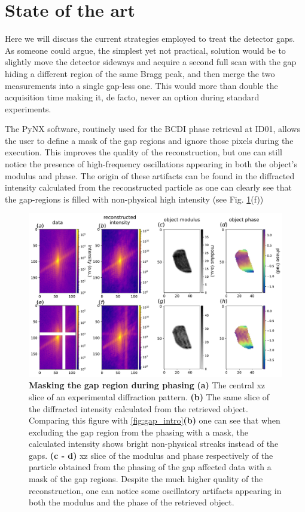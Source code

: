 \section{State of the art}\label{sec:InpStateArt}

Here we will discuss the current strategies employed to treat the detector gaps. As someone could argue, the simplest
yet not practical, solution would be to slightly move the detector sideways and acquire a second full scan with the
gap hiding a different region of the same Bragg peak, and then merge the two measurements into a single gap-less one. 
This would more than double the acquisition time making it, de facto, never an option during standard experiments. 

The PyNX software, routinely used for the BCDI phase retrieval at ID01, allows the user to define a mask of the gap 
regions and ignore those pixels during the execution. This improves the quality of the reconstruction, 
but one can still notice the presence of high-frequency oscillations appearing in both the object's modulus and phase.
The origin of these artifacts can be found in the diffracted intensity calculated from the reconstructed particle as 
one can clearly see that the gap-regions is filled with non-physical high intensity (see Fig. \ref{fig:gap_intro_mask}(f))

\begin{figure}[h]
    \includegraphics[width=\textwidth]{figures/Inpainting/gaps_mask.pdf}
    \caption{\textbf{Masking the gap region during phasing} 
    \textbf{(a)} The central xz slice of an experimental diffraction pattern. \textbf{(b)} The same slice of the diffracted
    intensity calculated from the retrieved object. Comparing this figure with \ref{fig:gap_intro}\textbf{(b)} one can see that
    when excluding the gap region from the phasing with a mask, the calculated intensity shows bright non-physical streaks 
    instead of the gaps. \textbf{(c - d)} xz slice of the modulus and phase respectively of the particle obtained from the 
    phasing of the gap affected data with a mask of the gap regions. Despite the much higher quality of the reconstruction, 
    one can notice some oscillatory artifacts appearing in both the modulus and the phase of the retrieved object. }
    \label{fig:gap_intro_mask}
\end{figure}

